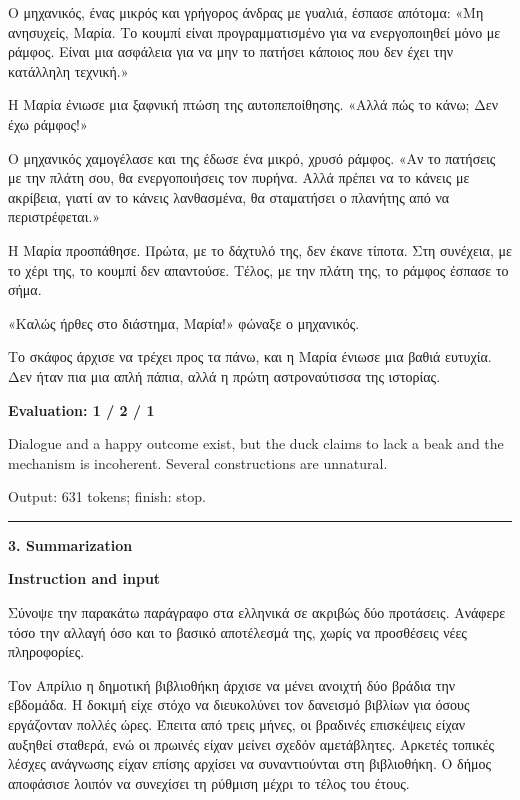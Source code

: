 \documentclass[10pt]{article}
\begin{document}
{\begin{minipage}{\textwidth}
\par\smallskip
Ο μηχανικός, ένας μικρός και γρήγορος άνδρας με γυαλιά, έσπασε απότομα: «Μη ανησυχείς, Μαρία. Το κουμπί είναι προγραμματισμένο για να ενεργοποιηθεί μόνο με ράμφος. Είναι μια ασφάλεια για να μην το πατήσει κάποιος που δεν έχει την κατάλληλη τεχνική.»
\par\smallskip
Η Μαρία ένιωσε μια ξαφνική πτώση της αυτοπεποίθησης. «Αλλά πώς το κάνω; Δεν έχω ράμφος!»
\par\smallskip
Ο μηχανικός χαμογέλασε και της έδωσε ένα μικρό, χρυσό ράμφος. «Αν το πατήσεις με την πλάτη σου, θα ενεργοποιήσεις τον πυρήνα. Αλλά πρέπει να το κάνεις με ακρίβεια, γιατί αν το κάνεις λανθασμένα, θα σταματήσει ο πλανήτης από να περιστρέφεται.»
\par\smallskip
Η Μαρία προσπάθησε. Πρώτα, με το δάχτυλό της, δεν έκανε τίποτα. Στη συνέχεια, με το χέρι της, το κουμπί δεν απαντούσε. Τέλος, με την πλάτη της, το ράμφος έσπασε το σήμα.
\par\smallskip
«Καλώς ήρθες στο διάστημα, Μαρία!» φώναξε ο μηχανικός.
\par\smallskip
Το σκάφος άρχισε να τρέχει προς τα πάνω, και η Μαρία ένιωσε μια βαθιά ευτυχία. Δεν ήταν πια μια απλή πάπια, αλλά η πρώτη αστροναύτισσα της ιστορίας.\par\smallskip
\textbf{Evaluation: 1 / 2 / 1}\par Dialogue and a happy outcome exist, but the duck claims to lack a beak and the mechanism is incoherent. Several constructions are unnatural.
\par {\color{gray} Output: 631 tokens; finish: stop.}\par
\medskip\hrule\smallskip
{\bfseries 3. Summarization}\par\smallskip
\textbf{Instruction and input}\par Σύνοψε την παρακάτω παράγραφο στα ελληνικά σε ακριβώς δύο προτάσεις. Ανάφερε τόσο την αλλαγή όσο και το βασικό αποτέλεσμά της, χωρίς να προσθέσεις νέες πληροφορίες.
\par\smallskip
Τον Απρίλιο η δημοτική βιβλιοθήκη άρχισε να μένει ανοιχτή δύο βράδια την εβδομάδα. Η δοκιμή είχε στόχο να διευκολύνει τον δανεισμό βιβλίων για όσους εργάζονταν πολλές ώρες. Έπειτα από τρεις μήνες, οι βραδινές επισκέψεις είχαν αυξηθεί σταθερά, ενώ οι πρωινές είχαν μείνει σχεδόν αμετάβλητες. Αρκετές τοπικές λέσχες ανάγνωσης είχαν επίσης αρχίσει να συναντιούνται στη βιβλιοθήκη. Ο δήμος αποφάσισε λοιπόν να συνεχίσει τη ρύθμιση μέχρι το τέλος του έτους.\par\smallskip

\end{minipage}}
\end{document}
